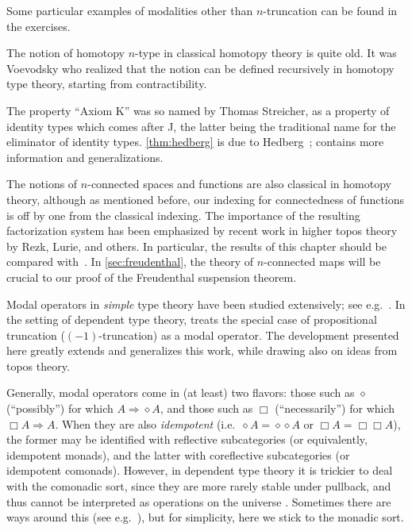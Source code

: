 Some particular examples of modalities other than $n$-truncation can be found in the exercises.


\sectionNotes

The notion of homotopy $n$-type in classical homotopy theory is quite old.
It was Voevodsky who realized that the notion can be defined recursively in homotopy type theory, starting from contractibility.

%
The property ``Axiom K'' was so named by Thomas Streicher, as a property of identity types which comes after J, the latter being the traditional name for the eliminator of identity types.
\autoref{thm:hedberg} is due to Hedberg~\cite{hedberg1998coherence}; \cite{krausgeneralizations} contains more information and generalizations.

The notions of $n$-connected spaces and functions are also classical in homotopy theory, although as mentioned before, our indexing for connectedness of functions is off by one from the classical indexing.
The importance of the resulting factorization system has been emphasized by recent work in higher topos theory by Rezk, Lurie, and others.%
In particular, the results of this chapter should be compared with~\cite[\S6.5.1]{lurie:higher-topoi}.
In \autoref{sec:freudenthal}, the theory of $n$-connected maps will be crucial to our proof of the Freudenthal suspension theorem.

Modal operators in \emph{simple} type theory have been studied extensively; see e.g.~\cite{modalTT}.  In the setting of dependent type theory, \cite{ab:bracket-types} treats the special case of propositional truncation ($(-1)$-truncation) as a modal operator.  The development presented here greatly extends and generalizes this work, while drawing also on ideas from topos theory.

Generally, modal operators come in (at least) two flavors: those such as $\diamond$ (``possibly'') for which $A\Rightarrow \diamond A$, and those such as $\Box$ (``necessarily'') for which $\Box A \Rightarrow A$.
When they are also \emph{idempotent} (i.e.\ $\diamond A = \diamond{\diamond A}$ or $\Box A = \Box{\Box A}$), the former may be identified with reflective subcategories (or equivalently, idempotent monads), and the latter with coreflective subcategories (or idempotent comonads).
However, in dependent type theory it is trickier to deal with the comonadic sort, since they are more rarely stable under pullback, and thus cannot be interpreted as operations on the universe \UU.
Sometimes there are ways around this (see e.g.~\cite{QGFTinCHoTT12}), but for simplicity, here we stick to the monadic sort.

